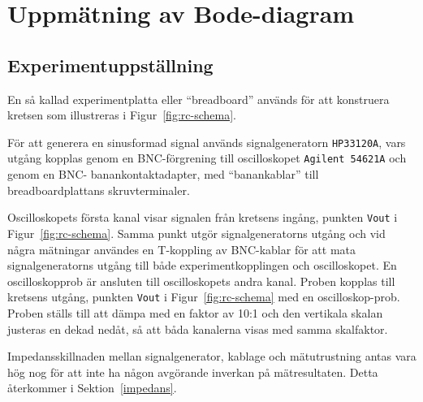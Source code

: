 %
%

\section{Uppmätning av Bode-diagram}\label{bode}

\subsection{Experimentuppställning}\label{}
En så kallad experimentplatta eller ``breadboard'' används för att konstruera
kretsen som illustreras i Figur~\ref{fig:rc-schema}.  \par För att generera en
sinusformad signal används signalgeneratorn \texttt{HP33120A}, vars utgång
kopplas genom en BNC-förgrening till oscilloskopet \texttt{Agilent 54621A} och
genom en BNC- banankontaktadapter, med ``banankablar'' till breadboardplattans
skruvterminaler.  \par Oscilloskopets första kanal visar signalen från kretsens
ingång, punkten \texttt{Vout} i Figur~\ref{fig:rc-schema}. Samma punkt utgör
signalgeneratorns utgång och vid några mätningar användes en T-koppling av
BNC-kablar för att mata signalgeneratorns utgång till både experimentkopplingen
och oscilloskopet.  En oscilloskopprob är ansluten till oscilloskopets andra
kanal. Proben kopplas till kretsens utgång, punkten \texttt{Vout} i
Figur~\ref{fig:rc-schema} med en oscilloskop-prob. Proben ställs till att dämpa
med en faktor av 10:1 och den vertikala skalan justeras en dekad nedåt, så att
båda kanalerna visas med samma skalfaktor.
\par Impedansskillnaden mellan signalgenerator, kablage och mätutrustning antas
vara hög nog för att inte ha någon avgörande inverkan på mätresultaten. Detta
återkommer i Sektion~\ref{impedans}.


